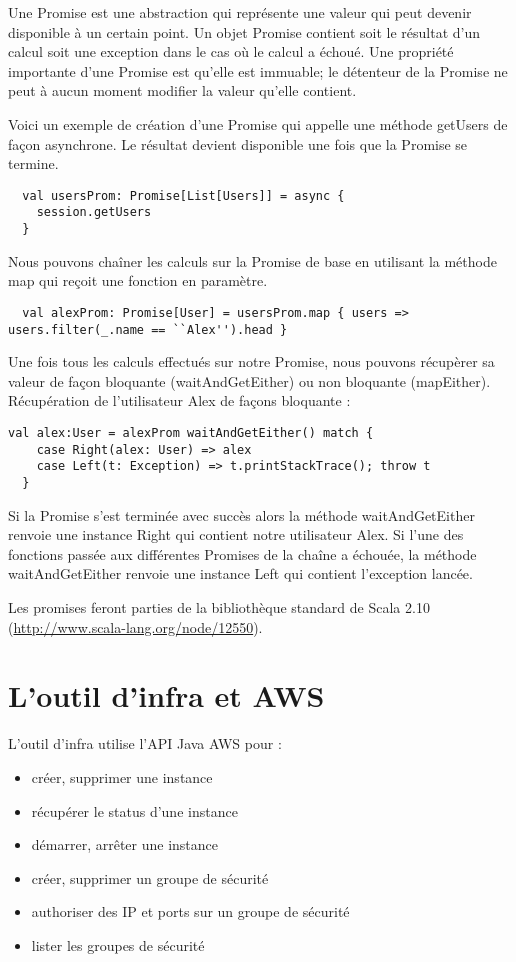 Une Promise est une abstraction qui représente une valeur qui peut devenir
disponible à un certain point.
Un objet Promise contient soit le résultat d'un calcul soit une exception dans
le cas où le calcul a échoué.
Une propriété importante d'une Promise est qu'elle est immuable; le détenteur de
la Promise ne peut à aucun moment modifier la valeur qu'elle contient.

Voici un exemple de création d'une Promise qui appelle une méthode getUsers de
façon asynchrone. Le résultat devient disponible une fois que la Promise se
termine.
\lstset{language=scala,
  frame=single                   %
}
\begin{lstlisting}
  val usersProm: Promise[List[Users]] = async {
    session.getUsers
  }
\end{lstlisting}

Nous pouvons chaîner les calculs sur la Promise de base en utilisant la méthode
map qui reçoit une fonction en paramètre.
\begin{lstlisting}
  val alexProm: Promise[User] = usersProm.map { users => users.filter(_.name == ``Alex'').head }
\end{lstlisting}

Une fois tous les calculs effectués sur notre Promise, nous pouvons récupèrer sa
valeur de façon bloquante (waitAndGetEither) ou non bloquante (mapEither).
Récupération de l'utilisateur Alex de façons bloquante :
\begin{lstlisting}
val alex:User = alexProm waitAndGetEither() match {
    case Right(alex: User) => alex
    case Left(t: Exception) => t.printStackTrace(); throw t
  }
\end{lstlisting}
Si la Promise s'est terminée avec succès alors la méthode waitAndGetEither
renvoie une instance Right qui contient notre utilisateur Alex.
Si l'une des fonctions passée aux différentes Promises de la chaîne a échouée, la
méthode waitAndGetEither renvoie une instance Left qui contient l'exception
lancée.

Les promises feront parties de la bibliothèque standard de Scala 2.10
(\url{http://www.scala-lang.org/node/12550}).

\section{L'outil d'infra et AWS}

L'outil d'infra utilise l'API Java AWS pour :
\begin{itemize}
\item créer, supprimer une instance
\item récupérer le status d'une instance
\item démarrer, arrêter une instance
\item créer, supprimer un groupe de sécurité
\item authoriser des IP et ports sur un groupe de sécurité
\item lister les groupes de sécurité
\end{itemize}

